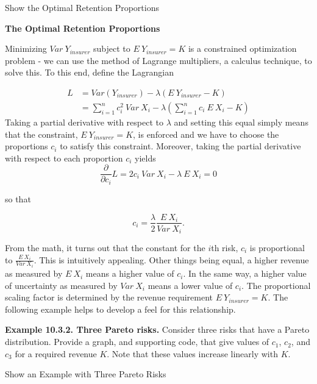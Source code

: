 \documentclass[]{book}
\theoremstyle{definition}
\theoremstyle{definition}
\theoremstyle{definition}
\theoremstyle{remark}
\begin{document}
Show the Optimal Retention Proportions

\hypertarget{toggleDerivationProof}{}
\textbf{The Optimal Retention Proportions}

Minimizing \(Var ~Y_{insurer}\) subject to \(E ~Y_{insurer} = K\) is a
constrained optimization problem - we can use the method of Lagrange
multipliers, a calculus technique, to solve this. To this end, define
the Lagrangian

\[
\begin{array}{ll}
L &= Var (Y_{insurer}) - \lambda (E ~Y_{insurer} - K) \\
&= \sum_{i=1}^n c_i^2 ~Var ~X_i - \lambda (\sum_{i=1}^n c_i ~E ~X_i - K) 
\end{array}
\] Taking a partial derivative with respect to \(\lambda\) and setting
this equal simply means that the constraint, \(E ~Y_{insurer} = K\), is
enforced and we have to choose the proportions \(c_i\) to satisfy this
constraint. Moreover, taking the partial derivative with respect to each
proportion \(c_i\) yields \[
\frac{\partial}{\partial c_i} L = 2 c_i ~Var~ X_i - \lambda ~E ~X_i = 0 
\]

so that

\[
c_i  =  \frac{\lambda}{2} \frac{E ~X_i}{Var ~X_i} .
\]

From the math, it turns out that the constant for the \(i\)th risk,
\(c_i\) is proportional to \(\frac{E ~X_i}{Var ~X_i}\). This is
intuitively appealing. Other things being equal, a higher revenue as
measured by \(E ~X_i\) means a higher value of \(c_i\). In the same way,
a higher value of uncertainty as measured by \(Var ~X_i\) means a lower
value of \(c_i\). The proportional scaling factor is determined by the
revenue requirement \(E ~Y_{insurer} = K\). The following example helps
to develop a feel for this relationship.

\textbf{Example 10.3.2. Three Pareto risks.} Consider three risks that
have a Pareto distribution. Provide a graph, and supporting code, that
give values of \(c_1\), \(c_2\), and \(c_3\) for a required revenue
\(K\). Note that these values increase linearly with \(K\).

Show an Example with Three Pareto Risks
\end{document}

